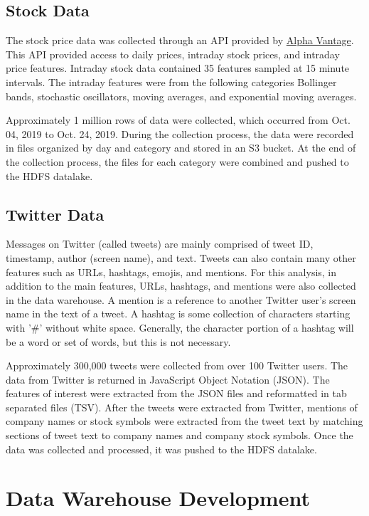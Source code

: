 \documentclass[journal]{IEEEtran}
\begin{document}
	\subsection{Stock Data}
	
	The stock price data was collected through an API provided by
	\href{https://www.alphavantage.co/}{Alpha Vantage}.
	This API provided access to daily prices, intraday stock prices,
	and intraday price features.
	Intraday stock data contained 35 features sampled at 15 minute intervals. 
	The intraday features were from the following categories Bollinger bands, 
	stochastic oscillators, moving averages, and exponential moving averages.
	
	Approximately 1 million rows of data were collected,
	which occurred from Oct. 04, 2019 to Oct. 24, 2019.
	During the collection process, the data were recorded in files
	organized by day and category and stored in an S3 bucket.
	At the end of the collection process, the files for each
	category were combined and pushed to the HDFS datalake.
	
	\subsection{Twitter Data}
	
	Messages on Twitter (called tweets) are mainly comprised of
	tweet ID, timestamp, author (screen name), and text.
	Tweets can also contain many other features such as
	URLs, hashtags, emojis,  and mentions.
	For this analysis, in addition to the main features,
	URLs, hashtags, and mentions were also collected in the data warehouse.
	A mention is a reference to another Twitter user's screen name
	in the text of a tweet.
	A hashtag is some collection of characters starting with
	'\#' without white space.
	Generally, the character portion of a hashtag will be a word or set of words,
	but this is not necessary.
	
	Approximately 300,000 tweets were collected from over 100 Twitter users.
	The data from Twitter is returned in JavaScript Object Notation (JSON).
	The features of interest were extracted from the JSON files and
	reformatted in tab separated files (TSV).
	After the tweets were extracted from Twitter,
	mentions of company names or stock symbols were extracted from the tweet text by
	matching sections of tweet text to company names and company stock symbols.
	Once the data was collected and processed, it was pushed to the HDFS datalake.
	
	
	\section{Data Warehouse Development}
	
\end{document}
